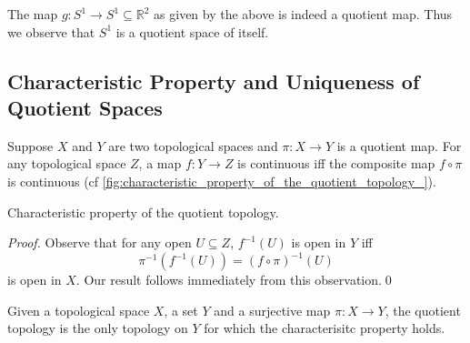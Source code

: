 \documentclass[notoc,notitlepage]{tufte-book}
\begin{document}
\begin{eg}
  The map $g : S^1 \to S^1 \subseteq \mathbb{R}^2$ as given by the above is indeed a quotient map.
  Thus we observe that $S^1$ is a quotient space of itself.
\end{eg}

\subsection{Characteristic Property and Uniqueness of Quotient Spaces}%
\label{sub:characteristic_property_and_uniqueness_of_quotient_spaces}

\begin{thm}\label{thm:characteristic_property_of_the_quotient_topology}
  Suppose $X$ and $Y$ are two topological spaces and $\pi : X \to Y$ is a quotient map. For any
  topological space $Z$, a map $f : Y \to Z$ is continuous iff the composite map $f \circ \pi$
  is continuous (cf \cref{fig:characteristic_property_of_the_quotient_topology_}).
  \begin{marginfigure}
    \centering
    \caption{Characteristic property of the quotient topology.}\label{fig:characteristic_property_of_the_quotient_topology_}
  \end{marginfigure}
\end{thm}

\begin{proof}
  Observe that for any open $U \subseteq Z$, $f^{-1}(U)$ is open in $Y$ iff
  \begin{equation*}
    \pi^{-1}(f^{-1}(U)) = (f \circ \pi)^{-1}(U)
  \end{equation*}
  is open in $X$. Our result follows immediately from this observation.\qed\
\end{proof}

\begin{thm}\label{thm:uniqueness_of_the_quotient_topology}
  Given a topological space $X$, a set $Y$ and a surjective map $\pi : X \to Y$, the quotient
  topology is the only topology on $Y$ for which the characterisitc property holds.
\end{thm}
\end{document}
